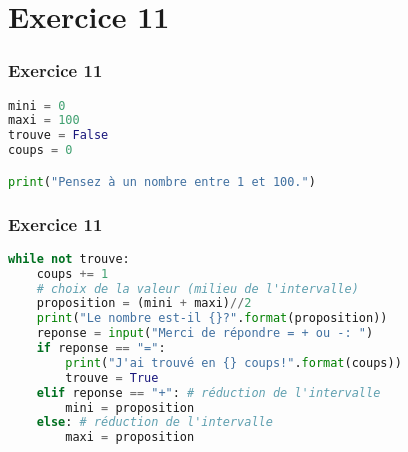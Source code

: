 \documentclass[svgnames,11pt]{beamer}
\begin{document}
\section{Exercice 11}
\begin{frame}[fragile]
    \frametitle{Exercice 11}

\begin{center}
\begin{lstlisting}[language=Python , basicstyle=\ttfamily\small, xleftmargin=1em, xrightmargin=1em]
mini = 0
maxi = 100
trouve = False
coups = 0

print("Pensez à un nombre entre 1 et 100.")
\end{lstlisting}
\label{CODE}
\end{center}  

\end{frame}
\begin{frame}[fragile]
    \frametitle{Exercice 11}

\begin{center}
\begin{lstlisting}[language=Python , basicstyle=\ttfamily\small, xleftmargin=1em, xrightmargin=1em]
while not trouve:
    coups += 1
    # choix de la valeur (milieu de l'intervalle)
    proposition = (mini + maxi)//2
    print("Le nombre est-il {}?".format(proposition))
    reponse = input("Merci de répondre = + ou -: ")
    if reponse == "=":
        print("J'ai trouvé en {} coups!".format(coups))
        trouve = True
    elif reponse == "+": # réduction de l'intervalle
        mini = proposition
    else: # réduction de l'intervalle
        maxi = proposition
\end{lstlisting}
\label{CODE}
\end{center}  

\end{frame}
\end{document}
